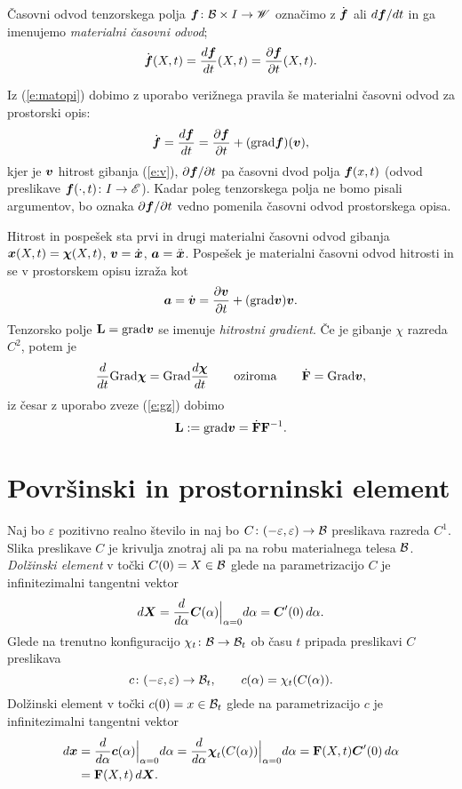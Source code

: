 \begin{definicija}
	Časovni odvod tenzorskega polja $\boldsymbol f\colon \mathcal B\times I\to\mathscr W$ označimo z
	$\dot{\boldsymbol f}$ ali $d\boldsymbol f/dt$ in ga imenujemo \emph{materialni časovni odvod};
	\[ \dot{\boldsymbol f}(X,t)=\frac{d\boldsymbol f}{dt}(X,t)=\frac{\partial\boldsymbol f}{\partial t}(X,t). \]
\end{definicija}
Iz (\ref{e:matopi}) dobimo z uporabo verižnega pravila še materialni časovni odvod za prostorski opis:
\begin{equation} \label{e:matodv}
	\dot{\boldsymbol f}=\frac{d\boldsymbol f}{dt}=
	\frac{\partial\boldsymbol f}{\partial t}+(\mathrm{grad}\boldsymbol f)(\boldsymbol v),
\end{equation}
kjer je $\boldsymbol v$ hitrost gibanja (\ref{e:v}), $\partial\boldsymbol f/\partial t$ pa
časovni dvod polja $\boldsymbol f(x,t)$ (odvod preslikave $\boldsymbol f(\cdot,t)\colon I\to\mathscr E$).
Kadar poleg tenzorskega polja ne bomo pisali argumentov,
bo oznaka $\partial\boldsymbol f/\partial t$ vedno pomenila časovni odvod prostorskega opisa.

\begin{primer} %
	Hitrost in pospešek sta prvi in drugi materialni časovni odvod gibanja $\boldsymbol x(X,t)=\boldsymbol \chi(X,t)$,
	$\boldsymbol v=\dot{\boldsymbol x}$, $\boldsymbol a=\ddot{\boldsymbol x}$.
	Pospešek je materialni časovni odvod hitrosti in se v prostorskem opisu izraža kot
	\[ \boldsymbol a=\dot{\boldsymbol v}=\frac{\partial\boldsymbol v}{\partial t}+(\mathrm{grad}\boldsymbol v)\boldsymbol v. \]
	Tenzorsko polje $\mathbf L=\mathrm{grad}\boldsymbol v$ se imenuje \emph{hitrostni gradient}.
	Če je gibanje $\chi$ razreda $C^2$, potem je
	\[
		\frac{d}{dt}\mathrm{Grad}\boldsymbol \chi=\mathrm{Grad}\frac{d\boldsymbol \chi}{dt}\qquad\textrm{oziroma}\qquad
		\dot{\mathbf F}=\mathrm{Grad}\boldsymbol v,
	\]
	iz česar z uporabo zveze (\ref{e:gz}) dobimo
	\begin{equation} \label{e:L}
		\mathbf L:=\mathrm{grad}\boldsymbol v=\dot{\mathbf F}\mathbf F^{-1}.
	\end{equation}
\end{primer}


\section{Površinski in prostorninski element}


Naj bo $\varepsilon$ pozitivno realno število in naj bo $C\colon(-\varepsilon,\varepsilon)\to\mathcal B$
preslikava razreda $C^1$. Slika preslikave $C$ je krivulja znotraj ali pa na robu
materialnega telesa $\mathcal B$. \emph{Dolžinski element} v točki $C(0)=X\in\mathcal B$ glede na parametrizacijo $C$
je infinitezimalni tangentni vektor
\[
	d\boldsymbol X=\frac{d}{d\alpha}\boldsymbol C(\alpha)\Big|_{\alpha=0}d\alpha=\boldsymbol C'(0)\, d\alpha.
\]
Glede na trenutno konfiguracijo $\chi_t\colon\mathcal B\to\mathcal B_t$ ob času $t$ pripada preslikavi $C$ preslikava
\[
	c\colon(-\varepsilon,\varepsilon)\to\mathcal B_t,\qquad c(\alpha)=\chi_t(C(\alpha)).
\]
Dolžinski element v točki $c(0)=x\in\mathcal B_t$ glede na parametrizacijo $c$ je infinitezimalni
tangentni vektor
\begin{align*}
	d\boldsymbol x&=\frac{d}{d\alpha}\boldsymbol c(\alpha)\Big|_{\alpha=0}d\alpha
	=\frac{d}{d\alpha}\boldsymbol \chi_t(C(\alpha))\Big|_{\alpha=0}d\alpha
	=\mathbf F(X,t)\boldsymbol C'(0)\,d\alpha \\
	&=\mathbf F(X,t)\,d\boldsymbol X.
\end{align*}

